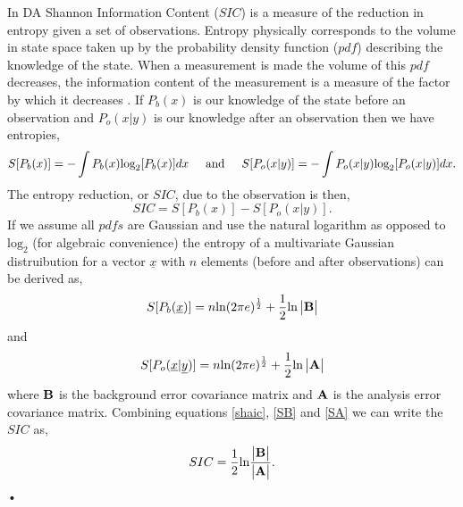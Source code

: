 \documentclass[11pt]{article}
\begin{document}
In DA Shannon Information Content ($SIC$) is a measure of the reduction in entropy given a set of observations. Entropy physically corresponds to the volume in state space taken up by the probability density function ($pdf$) describing the knowledge of the state. When a measurement is made the volume of this $pdf$ decreases, the information content of the measurement is a measure of the factor by which it decreases \cite{rodgers2000inverse}. If $P_b(x)$ is our knowledge of the state before an observation and $P_o(x|y)$ is our knowledge after an observation then we have entropies,
\[
S[P_b(x)] = - \int P_b(x)\text{log}_2[P_b(x)]dx
 \hspace{5mm} \text{and} \hspace{5mm} 
S[P_o(x|y)] = - \int P_o(x|y)\text{log}_2[P_o(x|y)]dx.
\]
The entropy reduction, or $SIC$, due to the observation is then,
\begin{equation} \label{shaic}
SIC =  S[P_b(x)]-S[P_o(x|y)].
\end{equation}
If we assume all $pdfs$ are Gaussian and use the natural logarithm as opposed to $\text{log}_2$ (for algebraic convenience) \cite{rodgers2000inverse} the entropy of a multivariate Gaussian distruibution for a vector $\underline{x}$ with $n$ elements (before and after observations) can be derived as,
\begin{equation} \label{SB}
 S[P_b(\underline{x})] = n\text{ln}(2\pi e)^{\frac{1}{2}}+\frac{1}{2}\text{ln}\begin{vmatrix}\bf{B}\end{vmatrix}
\end{equation}
and
\begin{equation} \label{SA}
 S[P_o(\underline{x}|\underline{y})] = n\text{ln}(2\pi e)^{\frac{1}{2}}+\frac{1}{2}\text{ln}\begin{vmatrix}\bf{A}\end{vmatrix}
\end{equation}
where $\bf{B}$ is the background error covariance matrix and $\bf{A}$ is the analysis error covariance matrix. Combining equations \ref{shaic}, \ref{SB} and \ref{SA} we can write the $SIC$ as,
\begin{equation}
SIC=\frac{1}{2}\text{ln}\frac{\begin{vmatrix} \bf{B} \end{vmatrix}}{\begin{vmatrix} \bf{A} \end{vmatrix}}.
\end{equation}•
\end{document}
